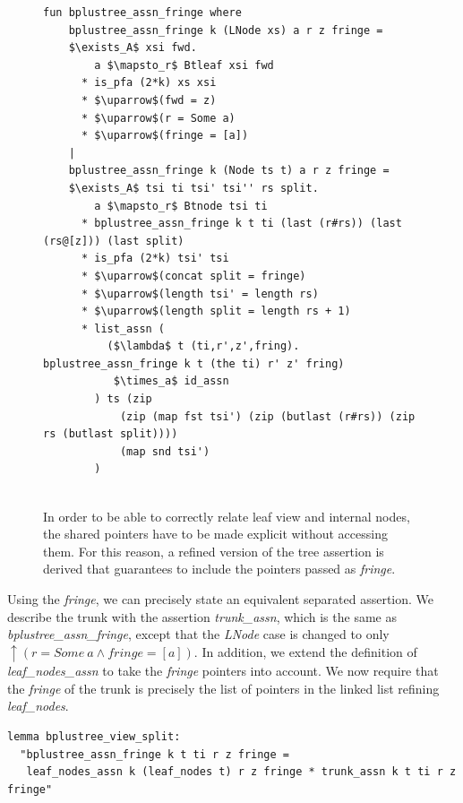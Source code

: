\documentclass[a4paper,UKenglish,cleveref, autoref, thm-restate]{lipics-v2021}
\newcommand{\btree}{B$^+$-tree}
\begin{document}
\begin{figure}
    \centering
\begin{lstlisting}[mathescape=true, language=Isabelle,label=lst:btree-assn-leafs]
fun bplustree_assn_fringe where
    bplustree_assn_fringe k (LNode xs) a r z fringe =
    $\exists_A$ xsi fwd.
        a $\mapsto_r$ Btleaf xsi fwd
      * is_pfa (2*k) xs xsi
      * $\uparrow$(fwd = z)
      * $\uparrow$(r = Some a)
      * $\uparrow$(fringe = [a])
    |
    bplustree_assn_fringe k (Node ts t) a r z fringe =
    $\exists_A$ tsi ti tsi' tsi'' rs split.
        a $\mapsto_r$ Btnode tsi ti
      * bplustree_assn_fringe k t ti (last (r#rs)) (last (rs@[z])) (last split)
      * is_pfa (2*k) tsi' tsi
      * $\uparrow$(concat split = fringe)
      * $\uparrow$(length tsi' = length rs)
      * $\uparrow$(length split = length rs + 1)
      * list_assn (
          ($\lambda$ t (ti,r',z',fring). bplustree_assn_fringe k t (the ti) r' z' fring)
           $\times_a$ id_assn
        ) ts (zip 
            (zip (map fst tsi') (zip (butlast (r#rs)) (zip rs (butlast split))))
            (map snd tsi')
        )
       
\end{lstlisting}
    \caption[\btree\ assertion with extracted fringe]{
        In order to be able to correctly relate leaf view and internal nodes,
        the shared pointers have to be made explicit without accessing them.
        For this reason, a refined version of the tree assertion is derived
        that guarantees to include the pointers passed as \emph{fringe}.
    }
    \label{fig:btree-assn-leafs}
\end{figure}


Using the \emph{fringe}, we can precisely state an equivalent separated assertion.
We describe the trunk with the assertion \emph{trunk\_assn},
which is the same as \emph{bplustree\_assn\_fringe},
except that the \emph{LNode} case is changed to only $\uparrow(r = \mathit{Some}\ a \wedge \mathit{fringe} = [a])$.
In addition, we extend the definition of \emph{leaf\_nodes\_assn}
to take the \emph{fringe} pointers into account.
We now require that the \emph{fringe} of the trunk is
precisely the list of pointers in the linked list refining \emph{leaf\_nodes}.

\begin{lstlisting}[mathescape=true, language=Isabelle,label=lst:btree-view-split]
lemma bplustree_view_split:
  "bplustree_assn_fringe k t ti r z fringe =
   leaf_nodes_assn k (leaf_nodes t) r z fringe * trunk_assn k t ti r z fringe"
\end{lstlisting}
\end{document}
